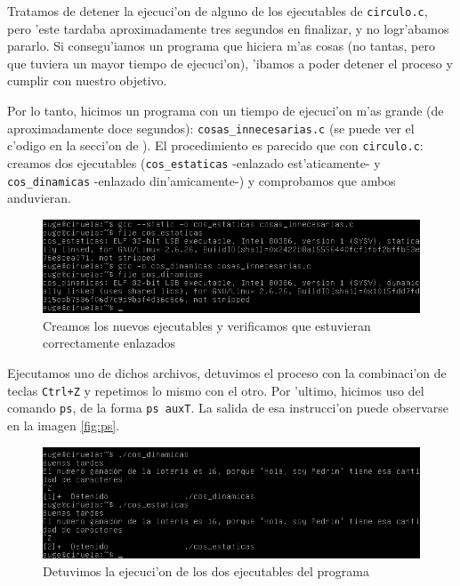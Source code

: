 \documentclass[11pt]{article}
\begin{document}
		Tratamos de detener la ejecuci'on de alguno de los ejecutables %
		de \texttt{circulo.c}, pero 'este tardaba aproximadamente tres segundos en finalizar, y no logr'abamos pararlo. Si consegu'iamos un programa que hiciera m'as cosas (no tantas, pero que tuviera un mayor tiempo de ejecuci'on), 'ibamos a poder detener el proceso y cumplir con nuestro objetivo.

		Por lo tanto, hicimos un programa con un tiempo de ejecuci'on m'as grande (de aproximadamente doce segundos): \texttt{cosas\_innecesarias.c} \label{cosas_innecesarias} (se puede ver el c'odigo en la secci'on de \texttt{}). El procedimiento es parecido que con \texttt{circulo.c}: creamos dos ejecutables (\texttt{cos\_estaticas} -enlazado est'aticamente- y \texttt{cos\_dinamicas} -enlazado din'amicamente-) y comprobamos que ambos anduvieran.

		\begin{figure}[H]
    			\centering \captionsetup{justification=centering}
    			\includegraphics[scale=0.65]{Images/Seccion 1/innecesario.png}
    			\caption{Creamos los nuevos ejecutables y verificamos que estuvieran correctamente enlazados}
    			\label{fig:innecesario}
		\end{figure}

		Ejecutamos uno de dichos archivos, detuvimos el proceso con la combinaci'on de teclas \texttt{Ctrl+Z} y repetimos lo mismo con el otro. Por 'ultimo, hicimos uso del comando \texttt{ps}, de la forma \texttt{ps auxT}. La salida de esa instrucci'on puede observarse en la imagen \ref{fig:ps}.

		\begin{figure}[H]
    			\centering
    			\includegraphics[scale=0.65]{Images/Seccion 1/detenidos.png}
    			\caption{Detuvimos la ejecuci'on de los dos ejecutables del programa}
    			\label{fig:detenidos}
		\end{figure}
\end{document}
